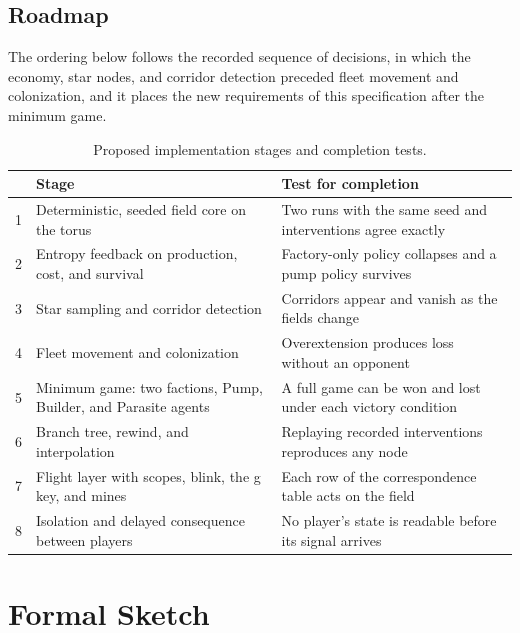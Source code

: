 \documentclass[11pt]{article}
\begin{document}
\subsection{Roadmap}

The ordering below follows the recorded sequence of decisions, in which the economy, star nodes, and corridor detection preceded fleet movement and colonization, and it places the new requirements of this specification after the minimum game.

\begin{table}[h]
\centering
\begin{tabular}{@{}p{0.6cm}p{5.2cm}p{5.8cm}@{}}
\toprule
 & Stage & Test for completion \\
\midrule
1 & Deterministic, seeded field core on the torus & Two runs with the same seed and interventions agree exactly \\
2 & Entropy feedback on production, cost, and survival & Factory-only policy collapses and a pump policy survives \\
3 & Star sampling and corridor detection & Corridors appear and vanish as the fields change \\
4 & Fleet movement and colonization & Overextension produces loss without an opponent \\
5 & Minimum game: two factions, Pump, Builder, and Parasite agents & A full game can be won and lost under each victory condition \\
6 & Branch tree, rewind, and interpolation & Replaying recorded interventions reproduces any node \\
7 & Flight layer with scopes, blink, the g key, and mines & Each row of the correspondence table acts on the field \\
8 & Isolation and delayed consequence between players & No player's state is readable before its signal arrives \\
\bottomrule
\end{tabular}
\caption{Proposed implementation stages and completion tests.}
\end{table}

\section{Formal Sketch}
\end{document}
